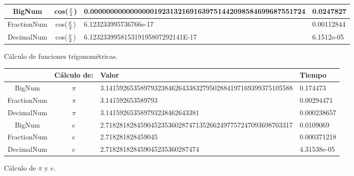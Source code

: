 \documentclass[a4paper,10pt,twocolumn]{article}
\begin{document}
\begin{figure}[!htbp]
\begin{center}
\begin{tabular}{|c|c|l|l|}
			BigNum      & cos($\pi\over 2$)  										
			            & 0.000000000000000019231321691639751442098584699687551724  
			            & 0.0247827   
			\\ \hline
			
			FractionNum & cos($\pi\over 2$)
			            & 6.123233995736766e-17                                       & 0.00112844  
			\\ \hline
			
			DecimalNum  & cos($\pi\over 2$)
			            & 6.123233995815319195807292141E-17                           & 6.1512e-05  
			\\ \hline
			
		\end{tabular}
		\caption{Cálculo de funciones trigonométricas. \label{fig:ex}}
	\end{center}
\end{figure}


\begin{figure}[h!]%
	\begin{center}
		\begin{tabular}{|c|c|l|l|} \hline
			
			            & Cálculo de:
			            & Valor 	    
			            & Tiempo	
			\\ \hline
			
			BigNum      & $\pi$

			
			            & 3.141592653589793238462643383279502884197169399375105588 & 0.174473     
			\\ \hline
			
			FractionNum & $\pi$

			
			            & 3.141592653589793                                        & 0.00294471   
			\\ \hline
			
			DecimalNum  & $\pi$

			
			            & 3.141592653589793238462643381                            & 0.000238657  
			\\ \hline
			
			BigNum      & $e$

			
			            & 2.718281828459045235360287471352662497757247093698703317 & 0.0109069    
			\\ \hline
			
			FractionNum & $e$

			
			            & 2.718281828459045                                        & 0.000371218  
			\\ \hline
			
			DecimalNum  & $e$

			
			            & 2.718281828459045235360287474                            & 4.31538e-05  
			\\ \hline
			
		\end{tabular}
		\caption{Cálculo de $\pi$ y $e$. \label{fig:ex}}
	\end{center}
\end{figure}
\end{document}

